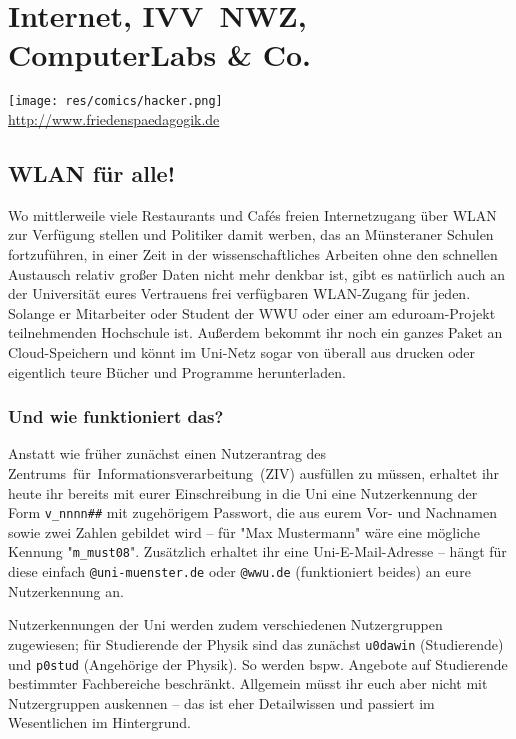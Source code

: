 \section{Internet, IVV~NWZ, ComputerLabs \& Co.}
\begin{multicols}{2}
	
	\texttt{[image: res/comics/hacker.png]}\\
	{\scriptsize\url{http://www.friedenspaedagogik.de}}
\subsection*{WLAN für alle!}
Wo mittlerweile viele Restaurants und Cafés freien Internetzugang über WLAN zur Verfügung stellen und Politiker damit werben, das an Münsteraner Schulen fortzuführen, in einer Zeit in der wissenschaftliches Arbeiten ohne den schnellen Austausch relativ großer Daten nicht mehr denkbar ist, gibt es natürlich auch an der Universität eures Vertrauens frei verfügbaren WLAN-Zugang für jeden. Solange er Mitarbeiter oder Student der WWU oder einer am eduroam-Projekt teilnehmenden Hochschule ist. Außerdem bekommt ihr noch ein ganzes Paket an Cloud-Speichern und könnt im Uni-Netz sogar von überall aus drucken oder eigentlich teure Bücher und Programme herunterladen. 

\subsubsection*{Und wie funktioniert das?}
Anstatt wie früher zunächst einen Nutzerantrag des Zentrums~für~Informationsverarbeitung~(ZIV) ausfüllen zu müssen, erhaltet ihr heute ihr bereits mit eurer Einschreibung in die Uni eine Nutzerkennung der Form \texttt{v\_nnnn\#\#} mit zugehörigem Passwort, die aus eurem Vor- und Nachnamen sowie zwei Zahlen gebildet wird -- für "Max Mustermann" wäre eine mögliche Kennung "\texttt{m\_must08}". Zusätzlich erhaltet ihr eine Uni-E-Mail-Adresse -- hängt für diese einfach \texttt{@uni-muenster.de} oder \texttt{@wwu.de} (funktioniert beides) an eure Nutzerkennung an.

Nutzerkennungen der Uni werden zudem verschiedenen Nutzergruppen zugewiesen; für Studierende der Physik sind das zunächst \texttt{u0dawin} (Studierende) und \texttt{p0stud} (Angehörige der Physik). So werden bspw. Angebote auf Studierende bestimmter Fachbereiche beschränkt. Allgemein müsst ihr euch aber nicht mit Nutzergruppen auskennen -- das ist eher Detailwissen und passiert im Wesentlichen im Hintergrund.


\end{multicols}
